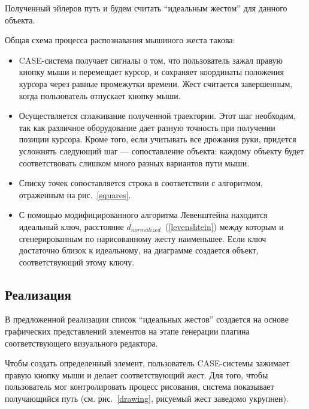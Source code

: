 \documentclass[a5paper]{article}
\begin{document}
Полученный эйлеров путь и будем считать ``идеальным жестом'' для данного объекта. 

Общая схема процесса распознавания мышиного жеста такова:

\begin{itemize}
  \item CASE-система получает сигналы о том, что пользователь зажал правую кнопку мыши и перемещает курсор, и сохраняет координаты положения курсора через равные промежутки времени. Жест считается завершенным, когда пользователь отпускает кнопку мыши.
  \item Осуществляется сглаживание полученной траектории. Этот шаг необходим, так как различное оборудование дает разную точность при получении позиции курсора. Кроме того, если учитывать все дрожания руки, придется усложнять следующий шаг --- сопоставление объекта: каждому объекту будет соответствовать слишком много разных вариантов пути мыши.
  \item Списку точек сопоставляется строка в соответствии с алгоритмом, отраженным на рис.~\ref{squares}.
  \item С помощью модифицированного алгоритма Левенштейна находится идеальный ключ, расстояние $d_{normalized}$~(\ref{levenshtein}) между которым и сгенерированным по нарисованному жесту наименьшее. Если ключ достаточно близок к идеальному, на диаграмме создается объект, соответствующий этому ключу.
\end{itemize}

\subsection{Реализация}
В предложенной реализации список ``идеальных жестов'' создается на основе графических представлений элементов на этапе генерации плагина соответствующего визуального редактора.

Чтобы создать определенный элемент, пользователь CASE-системы зажимает правую кнопку мыши и делает соответствующий жест. Для того, чтобы пользователь мог контролировать процесс рисования, система показывает получающийся путь (см. рис.~\ref{drawing}, рисуемый жест заведомо укрупнен).
\end{document}
